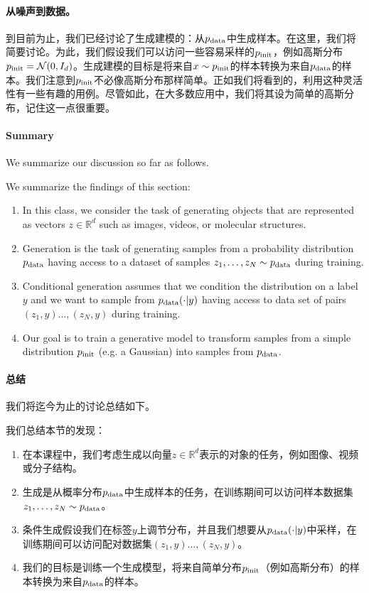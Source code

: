 \paragraph{从噪声到数据。} 到目前为止，我们已经讨论了生成建模的：从$p_{\rm{data}}$中生成样本。在这里，我们将简要讨论。为此，我们假设我们可以访问一些容易采样的$p_{\rm{init}}$，例如高斯分布$p_{\rm{init}}=\mathcal{N}(0,I_d)$。生成建模的目标是将来自$x\sim p_{\rm{init}}$的样本转换为来自$p_{\rm{data}}$的样本。我们注意到$p_{\rm{init}}$不必像高斯分布那样简单。正如我们将看到的，利用这种灵活性有一些有趣的用例。尽管如此，在大多数应用中，我们将其设为简单的高斯分布，记住这一点很重要。

\paragraph{Summary} We summarize our discussion so far as follows.\label{par:summary}
\begin{summarybox} We summarize the findings of this section:
\begin{enumerate}
\item In this class, we consider the task of generating objects that are represented as vectors $z\in\mathbb{R}^d$ such as images, videos, or molecular structures.
\item Generation is the task of generating samples from a probability distribution $p_{\rm{data}}$ having access to a dataset of samples $z_1,\dots,z_N\sim p_{\rm{data}}$ during training. 
\item Conditional generation assumes that we condition the distribution on a label $y$ and we want to sample from $p_{\rm{data}}(\cdot|y)$ having access to data set of pairs $(z_1,y)\dots,(z_N,y)$ during training.
\item Our goal is to train a generative model to transform samples from a simple distribution $p_{\rm{init}}$ (e.g. a Gaussian) into samples from $p_{\rm{data}}$.
\end{enumerate}
\end{summarybox}

\paragraph{总结} 我们将迄今为止的讨论总结如下。
\begin{summarybox}[生成即采样] 我们总结本节的发现：
\begin{enumerate}
\item 在本课程中，我们考虑生成以向量$z\in\mathbb{R}^d$表示的对象的任务，例如图像、视频或分子结构。
\item 生成是从概率分布$p_{\rm{data}}$中生成样本的任务，在训练期间可以访问样本数据集$z_1,\dots,z_N\sim p_{\rm{data}}$。
\item 条件生成假设我们在标签$y$上调节分布，并且我们想要从$p_{\rm{data}}(\cdot|y)$中采样，在训练期间可以访问配对数据集$(z_1,y)\dots,(z_N,y)$。
\item 我们的目标是训练一个生成模型，将来自简单分布$p_{\rm{init}}$（例如高斯分布）的样本转换为来自$p_{\rm{data}}$的样本。
\end{enumerate}
\end{summarybox}
